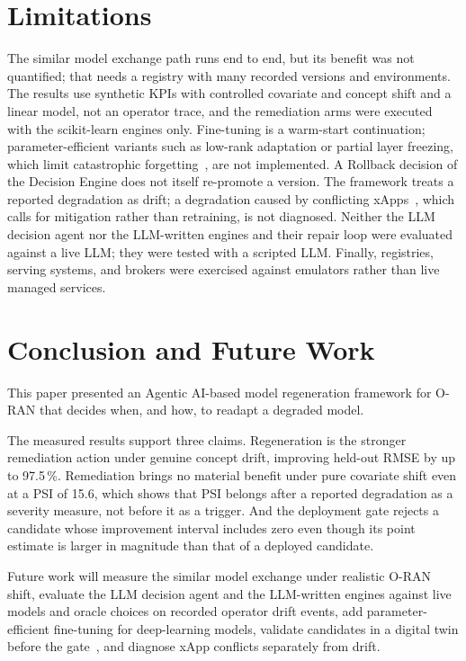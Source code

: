 \documentclass[conference]{IEEEtran}
\begin{document}
\section{Limitations}
The similar model exchange path runs end to end, but its benefit was not quantified; that needs
a registry with many recorded versions and environments. The results use synthetic KPIs with
controlled covariate and concept shift and a linear model, not an operator trace, and the
remediation arms were executed with the scikit-learn engines only. Fine-tuning is a warm-start
continuation; parameter-efficient variants such as low-rank adaptation or partial layer freezing,
which limit catastrophic forgetting~\cite{kong2024overcoming}, are not implemented. A Rollback
decision of the Decision Engine does not itself re-promote a version. The framework treats a
reported degradation as drift; a degradation caused by conflicting xApps~\cite{adamczyk2023conflict,wadud2024qacm},
which calls for mitigation rather than retraining, is not diagnosed. Neither the LLM decision
agent nor the LLM-written engines and their repair loop were evaluated against a live LLM; they
were tested with a scripted LLM. Finally, registries, serving systems, and brokers were exercised
against emulators rather than live managed services.

\balance
\section{Conclusion and Future Work}
This paper presented an Agentic AI-based model regeneration framework for O-RAN that decides
when, and how, to readapt a degraded model.

The measured results support three claims. Regeneration is the stronger remediation action under
genuine concept drift, improving held-out RMSE by up to 97.5\,\%. Remediation brings no material
benefit under pure covariate shift even at a PSI of 15.6, which shows that PSI belongs after a
reported degradation as a severity measure, not before it as a trigger. And the deployment gate
rejects a candidate whose improvement interval includes zero even though its point estimate is
larger in magnitude than that of a deployed candidate.

Future work will measure the similar model exchange under realistic O-RAN shift, evaluate the LLM
decision agent and the LLM-written engines against live models and oracle choices on recorded
operator drift events, add parameter-efficient fine-tuning for deep-learning models, validate
candidates in a digital twin before the gate~\cite{masaracchia2023digital,zakihindi2026reference},
and diagnose xApp conflicts separately from drift.
\end{document}
